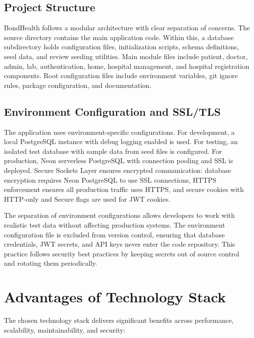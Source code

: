 \subsection{Project Structure}

\justifying
\noindent BondHealth follows a modular architecture with clear separation of concerns. The source directory contains the main application code. Within this, a database subdirectory holds configuration files, initialization scripts, schema definitions, seed data, and review seeding utilities. Main module files include patient, doctor, admin, lab, authentication, home, hospital management, and hospital registration components. Root configuration files include environment variables, git ignore rules, package configuration, and documentation.

\subsection{Environment Configuration and SSL/TLS}

\justifying
\noindent The application uses environment-specific configurations. For development, a local PostgreSQL instance with debug logging enabled is used. For testing, an isolated test database with sample data from seed files is configured. For production, Neon serverless PostgreSQL with connection pooling and SSL is deployed. Secure Sockets Layer ensures encrypted communication: database encryption requires Neon PostgreSQL to use SSL connections, HTTPS enforcement ensures all production traffic uses HTTPS, and secure cookies with HTTP-only and Secure flags are used for JWT cookies.

\justifying
\noindent The separation of environment configurations allows developers to work with realistic test data without affecting production systems. The environment configuration file is excluded from version control, ensuring that database credentials, JWT secrets, and API keys never enter the code repository. This practice follows security best practices by keeping secrets out of source control and rotating them periodically.

\section{Advantages of Technology Stack}

\justifying
\noindent The chosen technology stack delivers significant benefits across performance, scalability, maintainability, and security:

